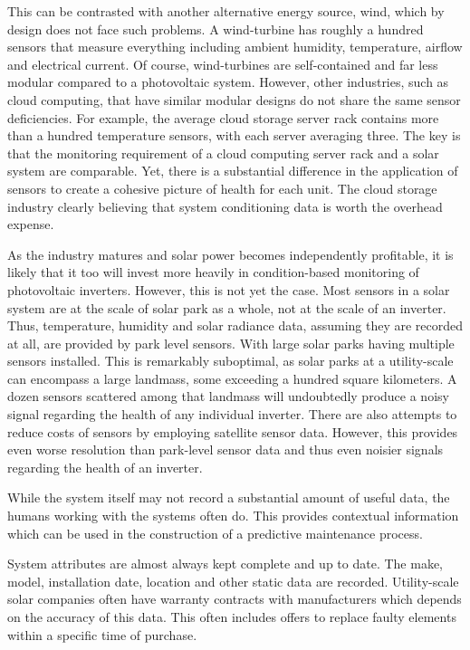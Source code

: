 This can be contrasted with another alternative energy source, wind, which by design does not face such problems. A wind-turbine has roughly a hundred sensors that measure everything including ambient humidity, temperature, airflow and electrical current\cite{Ciang2008}. Of course, wind-turbines are self-contained and far less modular compared to a photovoltaic system. However, other industries, such as cloud computing, that have similar modular designs do not share the same sensor deficiencies. For example, the average cloud storage server rack contains more than a hundred temperature sensors, with each server averaging three\cite{Patel2003}. The key is that the monitoring requirement of a cloud computing server rack and a solar system are comparable. Yet, there is a substantial difference in the application of sensors to create a cohesive picture of health for each unit. The cloud storage industry clearly believing that system conditioning data is worth the overhead expense. 

As the industry matures and solar power becomes independently profitable, it is likely that it too will invest more heavily in condition-based monitoring of photovoltaic inverters\cite{Feldman2014}. However, this is not yet the case. Most sensors in a solar system are at the scale of solar park as a whole, not at the scale of an inverter. Thus, temperature, humidity and solar radiance data, assuming they are recorded at all, are provided by park level sensors. With large solar parks having multiple sensors installed. This is remarkably suboptimal, as solar parks at a utility-scale can encompass a large landmass, some exceeding a hundred square kilometers. A dozen sensors scattered among that landmass will undoubtedly produce a noisy signal regarding the health of any individual inverter. There are also attempts to reduce costs of sensors by employing satellite sensor data. However, this provides even worse resolution than park-level sensor data and thus even noisier signals regarding the health of an inverter.

While the system itself may not record a substantial amount of useful data, the humans working with the systems often do. This provides contextual information which can be used in the construction of a predictive maintenance process. 

System attributes are almost always kept complete and up to date. The make, model, installation date, location and other static data are recorded. Utility-scale solar companies often have warranty contracts with manufacturers which depends on the accuracy of this data\cite{Grigoryan2010}. This often includes offers to replace faulty elements within a specific time of purchase. 

